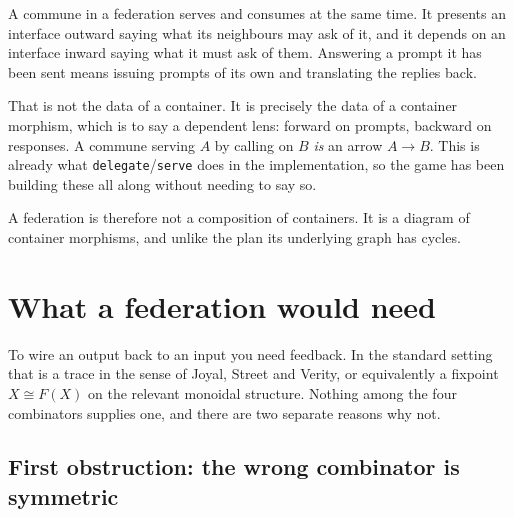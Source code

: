 \documentclass[11pt,a4paper]{article}
\begin{document}
A commune in a federation serves and consumes at the same time. It presents an
interface outward saying what its neighbours may ask of it, and it depends on an
interface inward saying what it must ask of them. Answering a prompt it has been
sent means issuing prompts of its own and translating the replies back.

That is not the data of a container. It is precisely the data of a container
morphism, which is to say a dependent lens: forward on prompts, backward on
responses. A commune serving $A$ by calling on $B$ \emph{is} an arrow
$A \to B$. This is already what \texttt{delegate}/\texttt{serve} does in the
implementation, so the game has been building these all along without needing to
say so.

A federation is therefore not a composition of containers. It is a diagram of
container morphisms, and unlike the plan its underlying graph has cycles.

\begin{center}
\end{center}

\section{What a federation would need}

To wire an output back to an input you need feedback. In the standard setting
that is a trace in the sense of Joyal, Street and Verity, or equivalently a
fixpoint $X \cong F(X)$ on the relevant monoidal structure. Nothing among the
four combinators supplies one, and there are two separate reasons why not.

\subsection*{First obstruction: the wrong combinator is symmetric}
\end{document}

